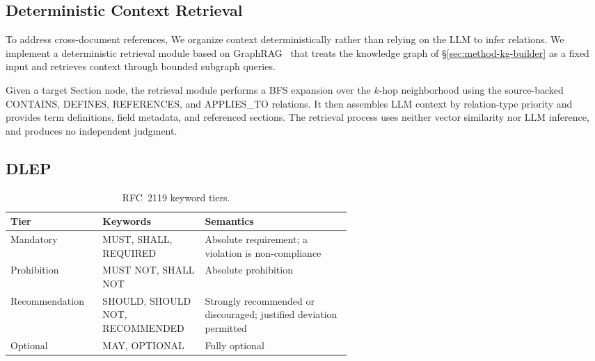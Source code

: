\subsection{Deterministic Context Retrieval}
\label{sec:method-graphrag}

To address cross-document references, We organize context deterministically rather than relying on the LLM to infer relations.
We implement a deterministic retrieval module based on GraphRAG~\cite{edge2024local} that treats the knowledge graph of \S\ref{sec:method-kg-builder} as a fixed input and retrieves context through bounded subgraph queries.

Given a target Section node, the retrieval module performs a BFS expansion over the $k$-hop neighborhood using the source-backed CONTAINS, DEFINES, REFERENCES, and APPLIES\_TO relations.
It then assembles LLM context by relation-type priority and provides term definitions, field metadata, and referenced sections. The retrieval process uses neither vector similarity nor LLM inference, and produces no independent judgment.

\subsection{DLEP}
\label{sec:method-dual-layer}

\begin{table}[!htbp]
\centering
\caption{RFC~2119 keyword tiers.}
\label{tab:rfc2119}
\setlength{\tabcolsep}{4pt}
\footnotesize
\begin{tabularx}{\columnwidth}{@{}L{0.27\linewidth} L{0.30\linewidth} X@{}}
\toprule
Tier & Keywords & Semantics \\
\midrule
Mandatory      & MUST, SHALL, REQUIRED   & Absolute requirement; a violation is non-compliance \\
Prohibition    & MUST NOT, SHALL NOT     & Absolute prohibition \\
Recommendation & SHOULD, SHOULD NOT, RECOMMENDED & Strongly recommended or discouraged; justified deviation permitted \\
Optional       & MAY, OPTIONAL           & Fully optional \\
\bottomrule
\end{tabularx}
\end{table}

